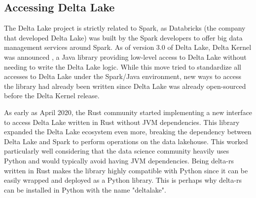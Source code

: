 \subsection{Accessing Delta Lake}
\label{subsec:delta_lake_access}

The Delta Lake project is strictly related to Spark, as Databricks (the company that developed Delta Lake) was built by the Spark developers \cite{zaharia2010spark} to offer big data management services around Spark. As of version 3.0 of Delta Lake, Delta Kernel was announced \cite{AnnouncingDeltaLake2023}, a Java library providing low-level access to Delta Lake without needing to write the Delta Lake logic. While this move tried to standardize all accesses to Delta Lake under the Spark/Java environment, new ways to access the library had already been written since Delta Lake was already open-sourced before the Delta Kernel release.

As early as April 2020, the Rust community started implementing a new interface to access Delta Lake written in Rust without \gls{JVM} dependencies. This library expanded the Delta Lake ecosystem even more, breaking the dependency between Delta Lake and Spark to perform operations on the data lakehouse. This worked particularly well considering that the data science community heavily uses Python and would typically avoid having \gls{JVM} dependencies. Being delta-rs written in Rust makes the library highly compatible with Python since it can be easily wrapped and deployed as a Python library. This is perhaps why delta-rs can be installed in Python with the name "deltalake".